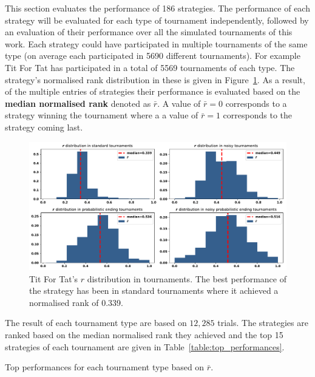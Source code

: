 \documentclass{article}
\begin{document}
This section evaluates the performance of 186 strategies. The performance of
each strategy will be evaluated for each type of tournament independently,
followed by an evaluation of their performance over all the simulated
tournaments of this work. Each strategy could have participated in multiple
tournaments of the same type (on average each participated in 5690 different
tournaments). For example Tit For Tat has participated in a total of 5569
tournaments of each type. The strategy's normalised rank distribution in these
is given in Figure~\ref{fig:tit_for_tat_r_distribution}. As a result, of the
multiple entries of strategies their performance is evaluated based on the
\textbf{median normalised rank} denoted as \(\bar{r}\). A value of \(\bar{r} =
0\) corresponds to a strategy winning the tournament where a a value of
\(\bar{r} = 1\) corresponds to the strategy coming last.

\begin{figure}[!htbp]
    \centering
    \includegraphics[width=.8\textwidth]{../images/tit_for_tat_r_distributions.pdf}
    \caption{Tit For Tat's $r$ distribution in tournaments. The best performance
    of the strategy has been in standard tournaments where it achieved a normalised
    rank of 0.339.}
    \label{fig:tit_for_tat_r_distribution}
\end{figure}

The result of each tournament type are based on $12,285$ trials. The strategies
are ranked based on the median normalised rank they achieved and the top 15
strategies of each tournament are given in Table~\ref{table:top_performances}.


\begin{table}[!htbp]
    \begin{center}
    \resizebox{.9\textwidth}{!}{
        
    }
\end{center}
\caption{Top performances for each tournament type based on $\bar{r}$.}
\label{table:top_performances}
\end{table}
\end{document}
